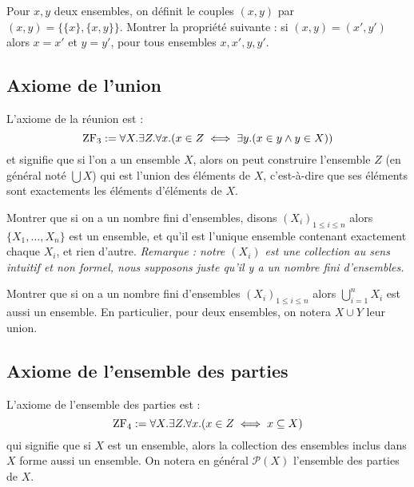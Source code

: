 \begin{exo}
    Pour $x,y$ deux ensembles, on définit le couples $(x,y)$ par $(x,y) = \{\{x\},\{x,y\}\}$. Montrer la propriété suivante : si $(x,y)=(x',y')$ alors $x=x'$ et $y=y'$, pour tous ensembles $x,x',y,y'$.
\end{exo}

\subsection{Axiome de l'union}

\begin{ax}[Union]
    L'axiome de la réunion est : $$\mathrm{ZF}_3 := \forall X.\exists Z. \forall x. (x\in Z \iff \exists y. (x\in y\land y\in X))$$ et signifie que si l'on a un ensemble $X$, alors on peut construire l'ensemble $Z$ (en général noté $\bigcup X$) qui est l'union des éléments de $X$, c'est-à-dire que ses éléments sont exactements les éléments d'éléments de $X$.
\end{ax}

\begin{exo}
    Montrer que si on a un nombre fini d'ensembles, disons $(X_i)_{1\leq i\leq n}$ alors $\{X_1,\ldots,X_n\}$ est un ensemble, et qu'il est l'unique ensemble contenant exactement chaque $X_i$, et rien d'autre. \textit{Remarque : notre $(X_i)$ est une collection au sens intuitif et non formel, nous supposons juste qu'il y a un nombre fini d'ensembles.}
\end{exo}

\begin{exo}
    Montrer que si on a un nombre fini d'ensembles $(X_i)_{1\leq i \leq n}$ alors $\displaystyle{\bigcup_{i = 1}^n X_i}$ est aussi un ensemble. En particulier, pour deux ensembles, on notera $X\cup Y$ leur union.
\end{exo}

\subsection{Axiome de l'ensemble des parties}

\begin{ax}
    L'axiome de l'ensemble des parties est : $$\mathrm{ZF}_4 := \forall X.\exists Z. \forall x. (x\in Z \iff x\subseteq X)$$ qui signifie que si $X$ est un ensemble, alors la collection des ensembles inclus dans $X$ forme aussi un ensemble. On notera en général $\mathcal P(X)$ l'ensemble des parties de $X$.
\end{ax}

